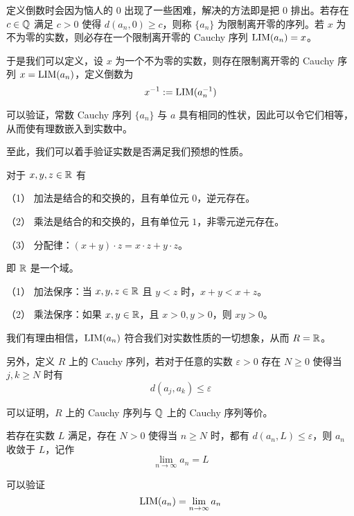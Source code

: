 定义倒数时会因为恼人的 $0$ 出现了一些困难，解决的方法即是把 $0$ 排出。若存在 $c\in \mathbb{Q}$ 满足 $c > 0$ 使得 $d(a_n,0) \geqslant c$，则称 $\{a_n\}$ 为限制离开零的序列。若 $x$ 为不为零的实数，则必存在一个限制离开零的 Cauchy 序列 $\operatorname{{LIM}}(a_n) = x$。

于是我们可以定义，设 $x$ 为一个不为零的实数，则存在限制离开零的 Cauchy 序列 $x=\operatorname{{LIM}}(a_n)$，定义倒数为
$$x^{-1} := \operatorname{{LIM}}(a_n^{-1})$$

可以验证，常数 Cauchy 序列 $\{a_n\}$ 与 $a$ 具有相同的性状，因此可以令它们相等，从而使有理数嵌入到实数中。

至此，我们可以着手验证实数是否满足我们预想的性质。

\begin{theorem}[$\RR$ 的代数算律]
	对于 $x,y,z\in \mathbb{R}$ 有

	（1） 加法是结合的和交换的，且有单位元 $0$，逆元存在。

	（2） 乘法是结合的和交换的，且有单位元 $1$，非零元逆元存在。

	（3） 分配律：$(x+y) \cdot  z = x \cdot z + y\cdot z$。
\end{theorem}

即 $\RR$ 是一个域。

\begin{theorem}[$\RR$ 是有序域]
	（1） 加法保序：当 $x,y,z\in \mathbb{R}$ 且 $y<z$ 时，$x+y<x+z$。

	（2） 乘法保序：如果 $x,y\in \mathbb{R}$，且 $x>0,y>0$，则 $xy>0$。
\end{theorem}

我们有理由相信，$\operatorname{{LIM}}(a_n)$ 符合我们对实数性质的一切想象，从而 $R = \mathbb{R}$。

另外，定义 $R$ 上的 Cauchy 序列，若对于任意的实数 $\varepsilon > 0$ 存在 $N \geqslant 0$ 使得当 $j,k \geqslant N$ 时有 
$$d(a_j,a_k) \leqslant \varepsilon$$

可以证明，$R$ 上的 Cauchy 序列与 $\mathbb{Q}$ 上的 Cauchy 序列等价。

若存在实数 $L$ 满足，存在 $N>0$ 使得当 $n \geqslant N$ 时，都有 $d(a_n,L) \leqslant \varepsilon$，则 $a_n$ 收敛于 $L$，记作
$$\lim_{n\to \infty} a_n = L$$

可以验证
$$\operatorname{{LIM}}(a_n) = \lim_{n\to \infty} a_n$$









